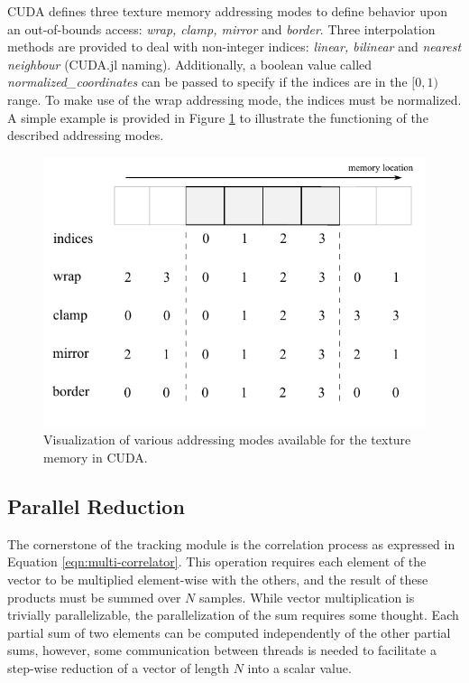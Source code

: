 \documentclass{juliacon}
\begin{document}
CUDA defines three texture memory addressing modes to define behavior upon an out-of-bounds access: \emph{wrap, clamp, mirror} and \emph{border}. Three interpolation methods are provided to deal with non-integer indices: \emph{linear, bilinear} and \emph{nearest neighbour} (CUDA.jl naming). Additionally, a boolean value called \emph{normalized\_coordinates} can be passed to specify if the indices are in the $[0, 1)$ range. To make use of the wrap addressing mode, the indices must be normalized. A simple example is provided in Figure \ref{fig:textmem} to illustrate the functioning of the described addressing modes.
\begin{figure}
    \centering
    \includegraphics[scale = 0.8]{figures/texture-memory.pdf}
    \caption{\label{fig:textmem}Visualization of various addressing modes available for the texture memory in CUDA.}
\end{figure}

\subsection*{Parallel Reduction}
The cornerstone of the tracking module is the correlation process as expressed in Equation \ref{eqn:multi-correlator}. This operation requires each element of the vector to be multiplied element-wise with the others, and the result of these products must be summed over $N$ samples. While vector multiplication is trivially parallelizable, the parallelization of the sum requires some thought. Each partial sum of two elements can be computed independently of the other partial sums, however, some communication between threads is needed to facilitate a step-wise reduction of a vector of length $N$ into a scalar value. 
\end{document}
